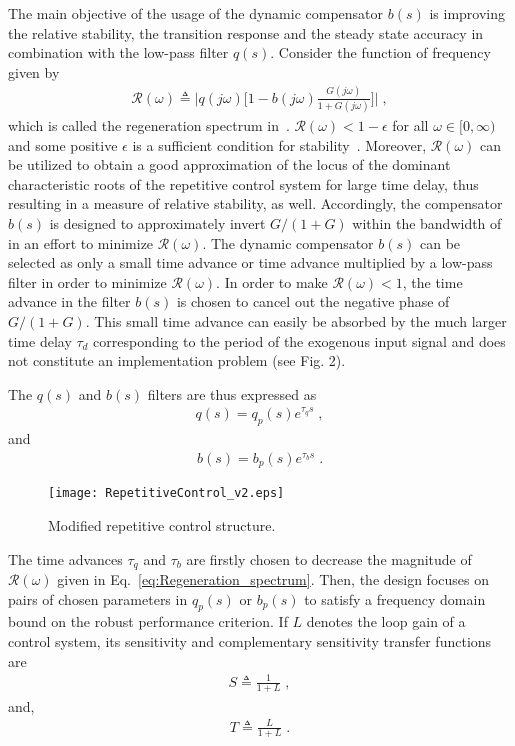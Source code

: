 \documentclass[12pt,draftcls,onecolumn]{IEEEtran}
\begin{document}
The main objective of the usage of the dynamic compensator $b(s)$ is improving the relative stability, the transition response and the steady state accuracy in combination with the low-pass filter $q(s)$. Consider the function of frequency given by
\begin{align}
	\mathcal{R}(\omega) \triangleq \bigg\vert q(j\omega) \Big[ 1-b(j\omega)\frac{G(j\omega)}{1+G(j\omega)} \Big] \bigg\vert \;,
	\label{eq:Regeneration_spectrum}
\end{align}
which is called the regeneration spectrum in~\cite{SrS:91}. $\mathcal{R}(\omega)<1-\epsilon$ for all $\omega\in [0,\infty )$ and some positive
$\epsilon$ is a sufficient condition for stability~\cite{SrS:91}. Moreover, $\mathcal{R}(\omega)$ can be utilized to obtain a good approximation of the locus of the dominant characteristic roots of the repetitive control system for large time delay, thus resulting in a measure
of relative stability, as well. Accordingly, the compensator $b(s)$ is designed to approximately invert $G/(1+G)$ within the
bandwidth of in an effort to minimize $\mathcal{R}(\omega)$. The dynamic compensator $b(s)$ can be selected as only a small time advance or
time advance multiplied by a low-pass filter in order to minimize $\mathcal{R}(\omega)$. In order to make $\mathcal{R}(\omega)<1$, the time advance in the filter $b(s)$ is chosen to cancel out the negative phase of $G/(1+G)$. This small time advance can easily be absorbed by the
much larger time delay $\tau_d$ corresponding to the period of the exogenous input signal and does not constitute an implementation
problem (see Fig. 2).

The $q(s)$ and $b(s)$ filters are thus expressed as
\begin{align}
	q(s)=q_{p}(s)e^{\tau_{q}s} \;,
\end{align}
and
\begin{align}
	b(s)=b_{p}(s)e^{\tau_{b}s} \;.
\end{align}

\begin{figure}\centering
    \texttt{[image: RepetitiveControl\_v2.eps]}\\
    \caption{Modified repetitive control structure.}\end{figure}


The time advances $\tau_{q}$ and $\tau_{b}$ are firstly chosen to decrease the magnitude of $\mathcal{R}(\omega)$ given in Eq.~\eqref{eq:Regeneration_spectrum}. Then, the
design focuses on pairs of chosen parameters in $q_{p}(s)$ or $b_{p}(s)$ to satisfy a frequency domain bound on the robust performance criterion. If $L$ denotes the loop gain of a control system, its sensitivity and complementary sensitivity transfer functions are
\begin{align}
	S \triangleq \frac{1}{1+L} \;,
\end{align}
and,
\begin{align}
	T \triangleq \frac{L}{1+L} \;.
\end{align}
\end{document}
